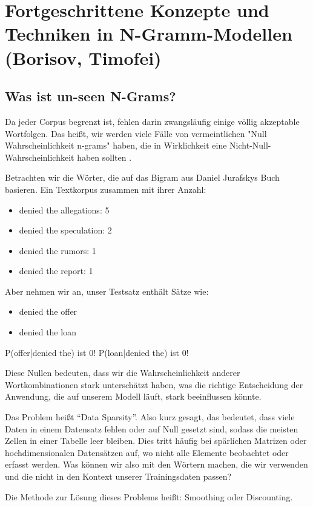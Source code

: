 \documentclass[12pt]{article}
\begin{document}
\section{Fortgeschrittene Konzepte und Techniken in N-Gramm-Modellen (Borisov, Timofei)}
\subsection{Was ist un-seen N-Grams?}
Da jeder Corpus begrenzt ist, fehlen darin zwangsläufig einige völlig akzeptable Wortfolgen. Das heißt, wir werden viele Fälle von vermeintlichen "Null Wahrscheinlichkeit n-grams" haben, die in Wirklichkeit eine Nicht-Null-Wahrscheinlichkeit haben sollten \cite{jurafsky2023}.

Betrachten wir die Wörter, die auf das Bigram aus Daniel Jurafskys Buch basieren. Ein Textkorpus zusammen mit ihrer Anzahl:

\begin{itemize}
	\item denied the allegations: 5
	\item denied the speculation: 2
	\item denied the rumors: 1
	\item denied the report: 1
\end{itemize}

Aber nehmen wir an, unser Testsatz enthält Sätze wie:
\begin{itemize}
	\item denied the offer
	\item denied the loan
\end{itemize}

P(offer|denied the) ist 0!
P(loan|denied the) ist 0!

Diese Nullen bedeuten, dass wir die Wahrscheinlichkeit anderer Wortkombinationen stark unterschätzt haben, was die richtige Entscheidung der Anwendung, die auf unserem Modell läuft, stark beeinflussen könnte.

Das Problem heißt “Data Sparsity”\cite{dremio2023}. Also kurz gesagt, das bedeutet, dass viele Daten in einem Datensatz fehlen oder auf Null gesetzt sind, sodass die meisten Zellen in einer Tabelle leer bleiben. Dies tritt häufig bei spärlichen Matrizen oder hochdimensionalen Datensätzen auf, wo nicht alle Elemente beobachtet oder erfasst werden. Was können wir also mit den Wörtern machen, die wir verwenden und die nicht in den Kontext unserer Trainingsdaten passen?

Die Methode zur Lösung dieses Problems heißt: Smoothing oder Discounting.
\end{document}
